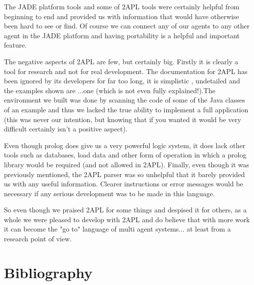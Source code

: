 \documentclass[a4paper]{article}
\begin{document}
The JADE platform tools and some of 2APL tools were certainly helpful from beginning to end and provided us with information that would have otherwise been hard to see or find. Of course we can connect any of our agents to any other agent in the JADE platform and having portability is a helpful and important feature.

The negative aspects of 2APL are few, but certainly big. Firstly it is clearly a tool for research and not for real development. The documentation for 2APL has been ignored by its developers for far too long, it is simplistic , undetailed and the examples shown are ...one (which is not even fully explained!).The environment we built was done by scanning the code of some of the Java classes of an example and thus we lacked the true ability to implement a full application (this was never our intention, but knowing that if you wanted it would be very difficult certainly isn't a positive aspect).

Even though prolog does give us a very powerful logic system, it does lack other tools such as databases, load data and other form of operation in which a prolog library would be required (and not allowed in 2APL). Finally, even though it was previously mentioned, the 2APL parser was so unhelpful that it barely provided us with any useful information. Clearer instructions or error messages would be necessary if any serious development was to be made in this language.

So even though we praised 2APL for some things and despised it for others, as a whole we were pleased to develop with 2APL and do believe that with more work it can become the "go to" language of multi agent systems... at least from a research point of view.


\section{Bibliography}
\nocite{*}


\end{document}
